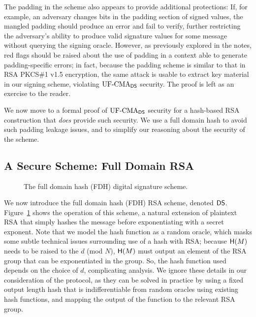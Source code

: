 The padding in the scheme also appears to provide additional protections: If, for example, an adversary changes bits in the padding section of signed values, the mangled padding should produce an error and fail to verify, further restricting the adversary's ability to produce valid signature values for some message without querying the signing oracle.  However, as previously explored in the notes, red flags should be raised about the use of padding in a context able to generate padding-specific errors; in fact, because the padding scheme is similar to that in RSA PKCS\#1 v1.5 encryption, the same attack is usable to extract key material in our signing scheme, violating $\textnormal{UF-CMA}_{{\mathsf{DS}}}$ security.  The proof is left as an exercise to the reader.

We now move to a formal proof of $\textnormal{UF-CMA}_{{\mathsf{DS}}}$ security for a hash-based RSA construction that \emph{does} provide such security.  We use a full domain hash to avoid such padding leakage issues, and to simplify our reasoning about the security of the scheme.

\subsection{A Secure Scheme: Full Domain RSA}
\begin{figure}[h]
\centering
{}
\caption{The full domain hash (FDH) digital signature scheme.}
\label{fig:fulldomrsa}
\end{figure}
We now introduce the full domain hash (FDH) RSA scheme, denoted ${\mathsf{DS}}$.  Figure~\ref{fig:fulldomrsa} shows the operation of this scheme, a natural extension of plaintext RSA that simply hashes the message before exponentiating with a secret exponent.  Note that we model the hash function as a random oracle, which masks some subtle technical issues surrounding use of a hash with RSA; because $\mathsf{H}(M)$ needs to be raised to the $d$ (mod $N$), $\mathsf{H}(M)$ must output an element of the RSA group that can be exponentiated in the group.  So, the hash function used depends on the choice of $d$, complicating analysis.  We ignore these details in our consideration of the protocol, as they can be solved in practice by using a fixed output length hash that is indifferentiable from random oracles using existing hash functions, and mapping the output of the function to the relevant RSA group.

